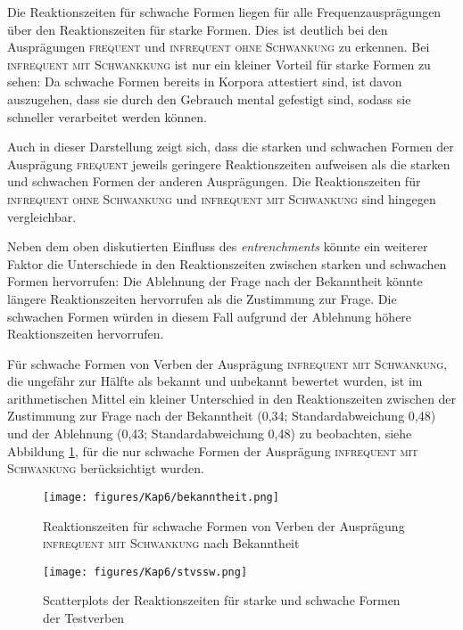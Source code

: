 Die Reaktionszeiten für schwache Formen liegen für alle Frequenzausprägungen über den Reaktionszeiten für starke Formen. Dies ist deutlich bei den Ausprägungen \textsc{frequent} und \textsc{infrequent ohne Schwankung} zu erkennen. Bei \textsc{infrequent mit Schwankkung} ist nur ein kleiner Vorteil für starke Formen zu sehen: Da schwache Formen bereits in Korpora attestiert sind, ist davon auszugehen, dass sie durch den Gebrauch mental gefestigt sind, sodass sie schneller verarbeitet werden können. 

Auch in dieser Darstellung zeigt sich, dass die starken und schwachen Formen der Ausprägung \textsc{frequent} jeweils geringere Reaktionszeiten aufweisen als die starken und schwachen Formen der anderen Ausprägungen. Die Reaktionszeiten für \textsc{infrequent ohne Schwankung} und \textsc{infrequent mit Schwankung} sind hingegen vergleichbar.

Neben dem oben diskutierten Einfluss des \textit{entrenchments} könnte ein weiterer Faktor die Unterschiede in den Reaktionszeiten zwischen starken und schwachen Formen hervorrufen: Die Ablehnung der Frage nach der Bekanntheit könnte längere Reaktionszeiten hervorrufen als die Zustimmung zur Frage. Die schwachen Formen würden in diesem Fall aufgrund der Ablehnung höhere Reaktionszeiten hervorrufen. 


Für schwache Formen von Verben der Ausprägung \textsc{infrequent mit Schwankung}, die ungefähr zur Hälfte als bekannt und unbekannt bewertet wurden, ist im arithmetischen Mittel ein kleiner Unterschied in den Reaktionszeiten zwischen der Zustimmung zur Frage nach der Bekanntheit (0,34; Standardabweichung 0,48) und der Ablehnung (0,43; Standardabweichung 0,48) zu beobachten, siehe Abbildung \ref{bekanntvsunbekannt}, für die nur schwache Formen der Ausprägung \textsc{infrequent mit Schwankung} berücksichtigt wurden. 

\begin{figure}[ph]
\texttt{[image: figures/Kap6/bekanntheit.png]} 
\caption{Reaktionszeiten für schwache Formen von Verben der Ausprägung \textsc{infrequent mit Schwankung} nach Bekanntheit}
\label{bekanntvsunbekannt}
\end{figure}

\begin{figure}[ph]
\texttt{[image: figures/Kap6/stvssw.png]} 
\caption{Scatterplots der Reaktionszeiten für starke und schwache Formen der Testverben}
\label{freqrtscatter}
\end{figure}

